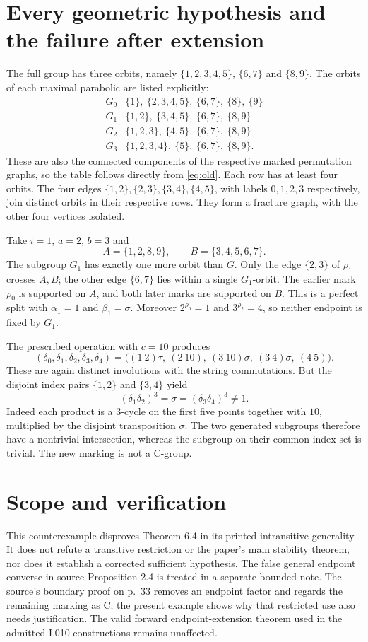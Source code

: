 \documentclass[11pt,a4paper]{article}
\begin{document}
\section{Every geometric hypothesis and the failure after extension}
The full group has three orbits, namely
$\{1,2,3,4,5\}$, $\{6,7\}$ and $\{8,9\}$.
The orbits of each maximal parabolic are listed explicitly:
\[
\begin{array}{c|l}
G_0&\{1\},\ \{2,3,4,5\},\ \{6,7\},\ \{8\},\ \{9\}\\
G_1&\{1,2\},\ \{3,4,5\},\ \{6,7\},\ \{8,9\}\\
G_2&\{1,2,3\},\ \{4,5\},\ \{6,7\},\ \{8,9\}\\
G_3&\{1,2,3,4\},\ \{5\},\ \{6,7\},\ \{8,9\}.
\end{array}
\]
These are also the connected components of the respective marked permutation
graphs, so the table follows directly from \eqref{eq:old}.
Each row has at least four orbits. The four edges
$\{1,2\},\{2,3\},\{3,4\},\{4,5\}$, with labels $0,1,2,3$ respectively,
join distinct orbits in their respective rows. They form a fracture graph,
with the other four vertices isolated.

Take $i=1$, $a=2$, $b=3$ and
\[
 A=\{1,2,8,9\},\qquad B=\{3,4,5,6,7\}.
\]
The subgroup $G_1$ has exactly one more orbit than $G$.
Only the edge $\{2,3\}$ of $\rho_1$ crosses $A,B$;
the other edge $\{6,7\}$ lies within a single $G_1$-orbit.
The earlier mark $\rho_0$ is supported on $A$, and both later marks
are supported on $B$. This is a perfect split with
$\alpha_1=1$ and $\beta_1=\sigma$.
Moreover $2^{\rho_0}=1$ and $3^{\rho_2}=4$, so neither endpoint
is fixed by $G_1$.

The prescribed operation with $c=10$ produces
\[
 (\delta_0,\delta_1,\delta_2,\delta_3,\delta_4)
 =\big((1\ 2)\tau,\ (2\ 10),\ (3\ 10)\sigma,
                     \ (3\ 4)\sigma,\ (4\ 5)\big).
\]
These are again distinct involutions with the string commutations.
But the disjoint index pairs $\{1,2\}$ and $\{3,4\}$ yield
\[
 (\delta_1\delta_2)^3=\sigma
       =(\delta_3\delta_4)^3\ne1.
\]
Indeed each product is a $3$-cycle on the first five points together
with $10$, multiplied by the disjoint transposition $\sigma$.
The two generated subgroups therefore have a nontrivial intersection,
whereas the subgroup on their common index set is trivial.
The new marking is not a C-group.

\section{Scope and verification}
This counterexample disproves Theorem 6.4 in its printed intransitive
generality. It does not refute a transitive restriction or the paper's main
stability theorem, nor does it establish a corrected sufficient hypothesis.
The false general endpoint converse in source Proposition 2.4 is treated
in a separate bounded note. The source's boundary proof on p.~33 removes
an endpoint factor and regards the remaining marking as C; the present
example shows why that restricted use also needs justification.
The valid forward endpoint-extension theorem used in the admitted L010
constructions remains unaffected.
\end{document}

